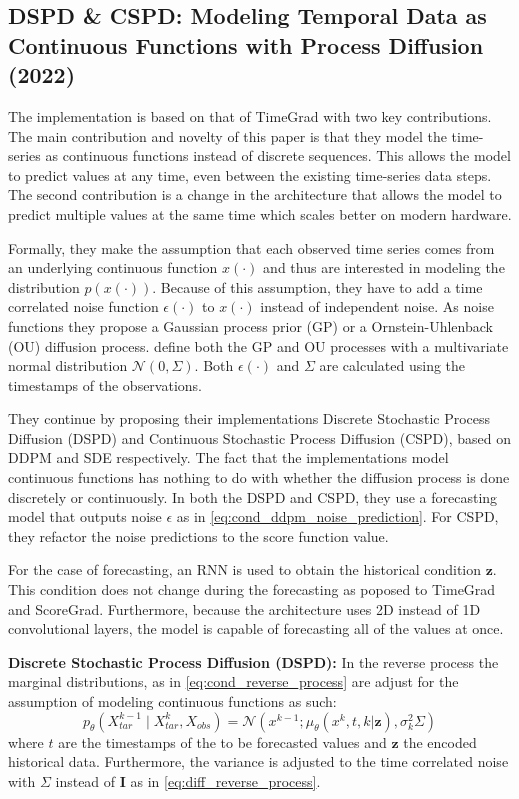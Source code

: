\subsection{DSPD \& CSPD: Modeling Temporal Data as Continuous Functions with Process Diffusion (2022) \cite{bilos_modeling_2022}} \label{sec:dspd_cspd}
The implementation is based on that of TimeGrad \cite{rasul_autoregressive_2021} with two key contributions.
The main contribution and novelty of this paper is that they model the time-series as continuous functions instead of discrete sequences. This allows the model to predict values at any time, even between the existing time-series data steps. The second contribution is a change in the architecture that allows the model to predict multiple values at the same time which scales better on modern hardware.

Formally, they make the assumption that each observed time series comes from an underlying continuous function $x(\cdot)$ and thus are interested in modeling the distribution $p(x(\cdot))$. Because of this assumption, they have to add a time correlated noise function $\epsilon(\cdot)$ to $x(\cdot)$ instead of independent noise. As noise functions they propose a Gaussian process prior (GP) or a Ornstein-Uhlenback (OU) diffusion process. \textcite{bilos_modeling_2022} define both the GP and OU processes with a multivariate normal distribution $\mathcal{N} (0, \Sigma)$. Both $\epsilon(\cdot)$ and $\Sigma$ are calculated using the timestamps of the observations.

They continue by proposing their implementations Discrete Stochastic Process Diffusion (DSPD) and Continuous Stochastic Process Diffusion (CSPD), based on DDPM and SDE respectively. The fact that the implementations model continuous functions has nothing to do with whether the diffusion process is done discretely or continuously. In both the DSPD and CSPD, they use a forecasting model that outputs noise $\epsilon$ as in \autoref{eq:cond_ddpm_noise_prediction}. For CSPD, they refactor the noise predictions to the score function value.

For the case of forecasting, an RNN is used to obtain the historical condition $\mathbf{z}$. This condition does not change during the forecasting as poposed to TimeGrad and ScoreGrad. Furthermore, because the architecture uses 2D instead of 1D convolutional layers, the model is capable of forecasting all of the values at once.

\textbf{Discrete Stochastic Process Diffusion (DSPD):}
In the reverse process the marginal distributions, as in \autoref{eq:cond_reverse_process} are adjust for the assumption of modeling continuous functions as such:
\begin{equation}
 \label{eq:dspd_cspd_time_reverse_process}
     p_\theta(X_{tar}^{k-1} \mid X_{tar}^k, X_{obs}) = \mathcal{N} (x^{k-1}; \mu_\theta(x^k, t, k | \mathbf{z}), \sigma^2_k \Sigma)
\end{equation}
where $t$ are the timestamps of the to be forecasted values and $\mathbf{z}$ the encoded historical data. Furthermore, the variance is adjusted to the time correlated noise with $\Sigma$ instead of $\mathbf{I}$ as in \autoref{eq:diff_reverse_process}.

